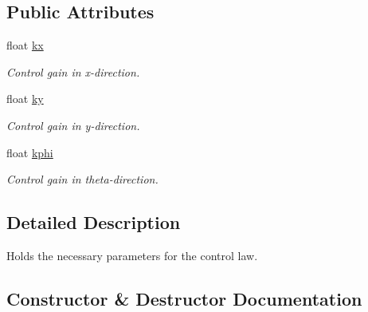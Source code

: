 \subsection*{Public Attributes}
\begin{DoxyCompactItemize}
\item 
\mbox{\label{structLyapunovController_1_1LyapunovParameter_af45ecc57706f7d6b9d1fcdf2fd355fc2}} 
float \hyperlink{structLyapunovController_1_1LyapunovParameter_af45ecc57706f7d6b9d1fcdf2fd355fc2}{kx}
\begin{DoxyCompactList}\small\item\em Control gain in x-\/direction. \end{DoxyCompactList}\item 
\mbox{\label{structLyapunovController_1_1LyapunovParameter_afcdfaafefdbafdc6cca6b2db8a45fe3a}} 
float \hyperlink{structLyapunovController_1_1LyapunovParameter_afcdfaafefdbafdc6cca6b2db8a45fe3a}{ky}
\begin{DoxyCompactList}\small\item\em Control gain in y-\/direction. \end{DoxyCompactList}\item 
\mbox{\label{structLyapunovController_1_1LyapunovParameter_a823275a2d5ddd96019b3d69ea327c95c}} 
float \hyperlink{structLyapunovController_1_1LyapunovParameter_a823275a2d5ddd96019b3d69ea327c95c}{kphi}
\begin{DoxyCompactList}\small\item\em Control gain in theta-\/direction. \end{DoxyCompactList}\end{DoxyCompactItemize}


\subsection{Detailed Description}
Holds the necessary parameters for the control law. 

\subsection{Constructor \& Destructor Documentation}
\mbox{\label{structLyapunovController_1_1LyapunovParameter_adb9af92d34ab58d439388000eab5deeb}} 

